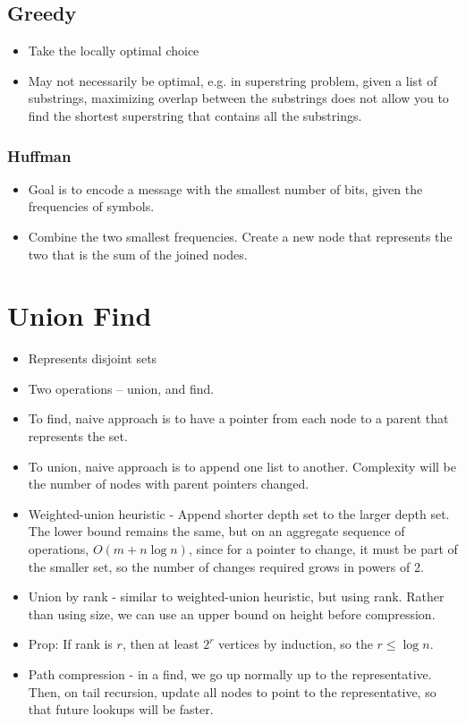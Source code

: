 \subsection{Greedy}
\begin{itemize}
    \item Take the locally optimal choice
    \item May not necessarily be optimal, e.g. in superstring problem, given a list of substrings, maximizing overlap between the substrings does not allow you to find the shortest superstring that contains all the substrings.
\end{itemize}
\subsubsection{Huffman}
\begin{itemize}
    \item Goal is to encode a message with the smallest number of bits, given the frequencies of symbols.
    \item Combine the two smallest frequencies. Create a new node that represents the two that is the sum of the joined nodes.
\end{itemize}

\section{Union Find}
\begin{itemize}
    \item Represents disjoint sets
    \item Two operations -- union, and find.
    \item To find, naive approach is to have a pointer from each node to a parent that represents the set.
    \item To union, naive approach is to append one list to another. Complexity will be the number of nodes with parent pointers changed.
    \item Weighted-union heuristic - Append shorter depth set to the larger depth set. The lower bound remains the same, but on an aggregate sequence of operations, $O(m+n\log n)$, since for a pointer to change, it must be part of the smaller set, so the number of changes required grows in powers of 2.
    \item Union by rank - similar to weighted-union heuristic, but using rank. Rather than using size, we can use an upper bound on height before compression.
    \item Prop: If rank is $r$, then at least $2^r$ vertices by induction, so the $r \leq \log n$.
    \item Path compression - in a find, we go up normally up to the representative. Then, on tail recursion, update all nodes to point to the representative, so that future lookups will be faster.
\end{itemize}

